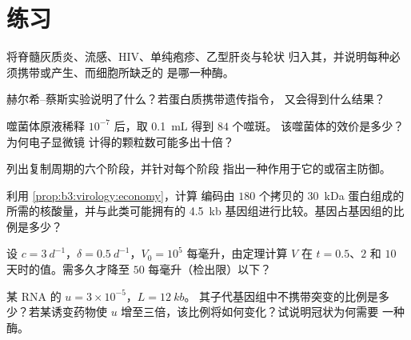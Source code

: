 \section{练习}

\begin{exercise}[$\star$]\label{exo:b3:virology:1}
将脊髓灰质炎、流感、HIV、单纯疱疹、乙型肝炎与轮状
归入其，并说明每种必须携带或产生、而细胞所缺乏的
是哪一种酶。
\end{exercise}

\begin{exercise}[$\star$]\label{exo:b3:virology:2}
赫尔希–蔡斯实验说明了什么？若蛋白质携带遗传指令，
又会得到什么结果？
\end{exercise}

\begin{exercise}[$\star$]\label{exo:b3:virology:3}
噬菌体原液稀释 $10^{-7}$ 后，取 \qty{0.1}{mL} 得到 $84$ 个噬斑。
该噬菌体的效价是多少？为何电子显微镜
计得的颗粒数可能多出十倍？
\end{exercise}

\begin{exercise}[$\star$]\label{exo:b3:virology:4}
列出复制周期的六个阶段，并针对每个阶段
指出一种作用于它的或宿主防御。
\end{exercise}

\begin{exercise}[$\star\star$]\label{exo:b3:virology:5}
利用 \cref{prop:b3:virology:economy}，计算
编码由 $180$ 个拷贝的
\qty{30}{kDa} 蛋白组成的所需的核酸量，并与此类可能拥有的
\qty{4.5}{kb} 基因组进行比较。基因占基因组的比例是多少？
\end{exercise}

\begin{exercise}[$\star\star$]\label{exo:b3:virology:6}
设 $c = \qty{3}{d^{-1}}$，$\delta = \qty{0.5}{d^{-1}}$，$V_{0} =
10^{5}$ 每毫升，由定理计算 $V$ 在 $t = 0.5$、$2$ 和
$10$ 天时的值。需多久才降至
$50$ 每毫升（检出限）以下？
\end{exercise}

\begin{exercise}[$\star\star$]\label{exo:b3:virology:7}
某 RNA 的 $u = 3\times 10^{-5}$，$L = \qty{12}{kb}$。
其子代基因组中不携带突变的比例是多少？若某诱变药物使 $u$
增至三倍，该比例将如何变化？试说明冠状为何需要
一种酶。
\end{exercise}

